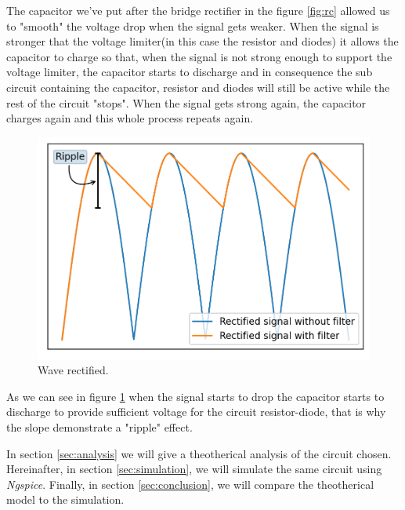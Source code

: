 The capacitor we've put after the bridge rectifier in the figure \ref{fig:rc} allowed us to "smooth"
the voltage drop when the signal gets weaker. When the signal is stronger that the voltage limiter(in this case the resistor and diodes)
it allows the capacitor to charge so that, when the signal is not strong enough to support the voltage limiter, the capacitor
starts to discharge and in consequence the sub circuit containing the capacitor, resistor and diodes will still be
active while the rest of the circuit "stops". When the signal gets strong again, the capacitor charges again and this whole process repeats again.
\begin{figure}[h] \centering
    \includegraphics[scale=0.8]{filter.png}
    \caption{Wave rectified.}
    \label{fig:rc5}
\end{figure}
As we can see in figure \ref{fig:rc5} when the signal starts to drop the capacitor starts to discharge to provide
sufficient voltage for the circuit resistor-diode, that is why the slope demonstrate a "ripple" effect.

In section \ref{sec:analysis} we will give a theotherical analysis of the circuit chosen.
Hereinafter, in section \ref{sec:simulation}, we will simulate the same circuit using \emph{Ngspice}.
Finally, in section \ref{sec:conclusion}, we will compare the theotherical model to the simulation.

